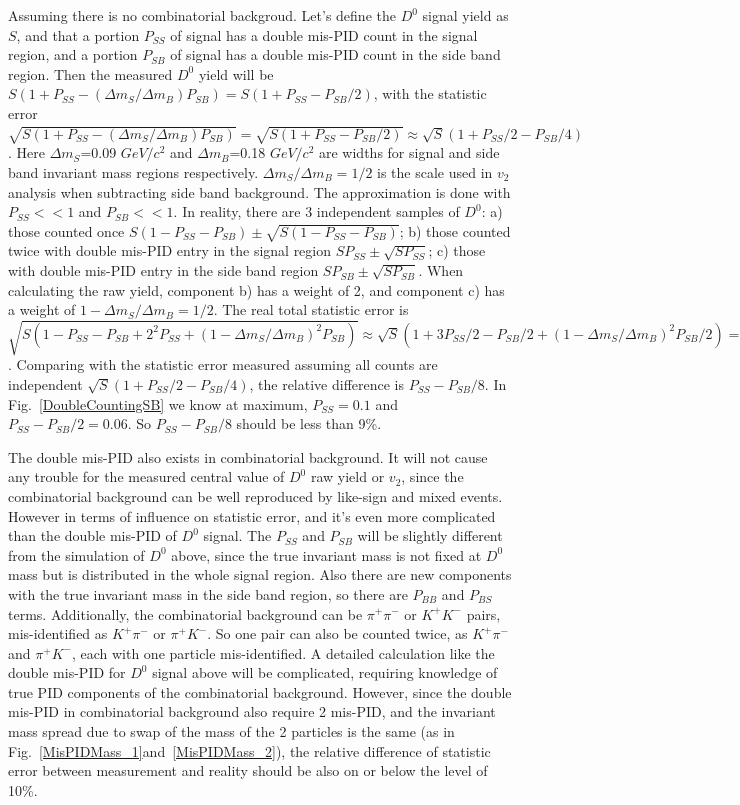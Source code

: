 \documentclass[a4paper]{article}
\begin{document}
Assuming there is no combinatorial backgroud. Let's define the $D^0$ signal yield as $S$, and that a portion $P_{SS}$ of signal has a double mis-PID count in the signal region, and a portion $P_{SB}$ of signal has a double mis-PID count in the side band region. Then the measured $D^0$ yield will be $S(1+P_{SS}-({\Delta}m_S/{\Delta}m_B)P_{SB})=S(1+P_{SS}-P_{SB}/2)$, with the statistic error $\sqrt{S(1+P_{SS}-({\Delta}m_S/{\Delta}m_B)P_{SB})}=\sqrt{S(1+P_{SS}-P_{SB}/2)}\approx\sqrt{S}(1+P_{SS}/2-P_{SB}/4)$. Here ${\Delta}m_S$=0.09 $GeV/c^2$ and ${\Delta}m_B$=0.18 $GeV/c^2$ are widths for signal and side band invariant mass regions respectively. ${\Delta}m_S/{\Delta}m_B=1/2$ is the scale used in $v_2$ analysis when subtracting side band background. The approximation is done with $P_{SS}<<1$ and $P_{SB}<<1$. In reality, there are 3 independent samples of $D^0$: a) those counted once $S(1-P_{SS}-P_{SB})\pm\sqrt{S(1-P_{SS}-P_{SB})}$; b) those counted twice with double mis-PID entry in the signal region $SP_{SS}\pm\sqrt{SP_{SS}}$; c) those with double mis-PID entry in the side band region $SP_{SB}\pm\sqrt{SP_{SB}}$. When calculating the raw yield, component b) has a weight of 2, and component c) has a weight of $1-{\Delta}m_S/{\Delta}m_B=1/2$. The real total statistic error is $\sqrt{S(1-P_{SS}-P_{SB}+2^2P_{SS}+(1-{\Delta}m_S/{\Delta}m_B)^2P_{SB})}\approx\sqrt{S}(1+3P_{SS}/2-P_{SB}/2+(1-{\Delta}m_S/{\Delta}m_B)^2P_{SB}/2)=\sqrt{S}(1+3P_{SS}/2-3P_{SB}/8)$. Comparing with the statistic error measured assuming all counts are independent $\sqrt{S}(1+P_{SS}/2-P_{SB}/4)$, the relative difference is $P_{SS}-P_{SB}/8$. In Fig.~\ref{DoubleCountingSB} we know at maximum, $P_{SS}=0.1$ and $P_{SS}-P_{SB}/2=0.06$. So $P_{SS}-P_{SB}/8$ should be less than 9\%.

The double mis-PID also exists in combinatorial background. It will not cause any trouble for the measured central value of $D^0$ raw yield or $v_2$, since the combinatorial background can be well reproduced by like-sign and mixed events. However in terms of influence on statistic error, and it's even more complicated than the double mis-PID of $D^0$ signal. The $P_{SS}$ and $P_{SB}$ will be slightly different from the simulation of $D^0$ above, since the true invariant mass is not fixed at $D^0$ mass but is distributed in the whole signal region. Also there are new components with the true invariant mass in the side band region, so there are $P_{BB}$ and $P_{BS}$ terms. Additionally, the combinatorial background can be $\pi^+\pi^-$ or $K^+K^-$ pairs, mis-identified as $K^+\pi^-$ or $\pi^+K^-$. So one pair can also be counted twice, as $K^+\pi^-$ and $\pi^+K^-$, each with one particle mis-identified. A detailed calculation like the double mis-PID for $D^0$ signal above will be complicated, requiring knowledge of true PID components of the combinatorial background. However, since the double mis-PID in combinatorial background also require 2 mis-PID, and the invariant mass spread due to swap of the mass of the 2 particles is the same (as in Fig.~\ref{MisPIDMass_1}and~\ref{MisPIDMass_2}), the relative difference of statistic error between measurement and reality should be also on or below the level of 10\%.
\end{document}
